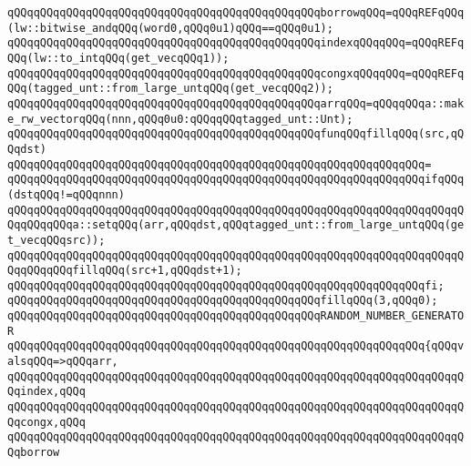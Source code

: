 \newline
\verb|qQQqqQQqqQQqqQQqqQQqqQQqqQQqqQQqqQQqqQQqqQQqqQQqborrowqQQq=qQQqREFqQQq(lw::bitwise_andqQQq(word0,qQQq0u1)qQQq==qQQq0u1);|\newline
\verb|qQQqqQQqqQQqqQQqqQQqqQQqqQQqqQQqqQQqqQQqqQQqqQQqindexqQQqqQQq=qQQqREFqQQq(lw::to_intqQQq(get_vecqQQq1));|\newline
\verb|qQQqqQQqqQQqqQQqqQQqqQQqqQQqqQQqqQQqqQQqqQQqqQQqcongxqQQqqQQq=qQQqREFqQQq(tagged_unt::from_large_untqQQq(get_vecqQQq2));|\newline
\newline
\verb|qQQqqQQqqQQqqQQqqQQqqQQqqQQqqQQqqQQqqQQqqQQqqQQqarrqQQq=qQQqqQQqa::make_rw_vectorqQQq(nnn,qQQq0u0:qQQqqQQqtagged_unt::Unt);|\newline
\newline
\verb|qQQqqQQqqQQqqQQqqQQqqQQqqQQqqQQqqQQqqQQqqQQqqQQqfunqQQqfillqQQq(src,qQQqdst)|\newline
\verb|qQQqqQQqqQQqqQQqqQQqqQQqqQQqqQQqqQQqqQQqqQQqqQQqqQQqqQQqqQQqqQQq=|\newline
\verb|qQQqqQQqqQQqqQQqqQQqqQQqqQQqqQQqqQQqqQQqqQQqqQQqqQQqqQQqqQQqqQQqifqQQq(dstqQQq!=qQQqnnn)|\newline
\verb|qQQqqQQqqQQqqQQqqQQqqQQqqQQqqQQqqQQqqQQqqQQqqQQqqQQqqQQqqQQqqQQqqQQqqQQqqQQqqQQqa::setqQQq(arr,qQQqdst,qQQqtagged_unt::from_large_untqQQq(get_vecqQQqsrc));|\newline
\verb|qQQqqQQqqQQqqQQqqQQqqQQqqQQqqQQqqQQqqQQqqQQqqQQqqQQqqQQqqQQqqQQqqQQqqQQqqQQqqQQqfillqQQq(src+1,qQQqdst+1);|\newline
\verb|qQQqqQQqqQQqqQQqqQQqqQQqqQQqqQQqqQQqqQQqqQQqqQQqqQQqqQQqqQQqqQQqfi;|\newline
\newline
\verb|qQQqqQQqqQQqqQQqqQQqqQQqqQQqqQQqqQQqqQQqqQQqqQQqfillqQQq(3,qQQq0);|\newline
\newline
\verb|qQQqqQQqqQQqqQQqqQQqqQQqqQQqqQQqqQQqqQQqqQQqqQQqRANDOM_NUMBER_GENERATOR|\newline
\verb|qQQqqQQqqQQqqQQqqQQqqQQqqQQqqQQqqQQqqQQqqQQqqQQqqQQqqQQqqQQqqQQq{qQQqvalsqQQq=>qQQqarr,|\newline
\verb|qQQqqQQqqQQqqQQqqQQqqQQqqQQqqQQqqQQqqQQqqQQqqQQqqQQqqQQqqQQqqQQqqQQqqQQqindex,qQQq|\newline
\verb|qQQqqQQqqQQqqQQqqQQqqQQqqQQqqQQqqQQqqQQqqQQqqQQqqQQqqQQqqQQqqQQqqQQqqQQqcongx,qQQq|\newline
\verb|qQQqqQQqqQQqqQQqqQQqqQQqqQQqqQQqqQQqqQQqqQQqqQQqqQQqqQQqqQQqqQQqqQQqqQQqborrow|\newline
